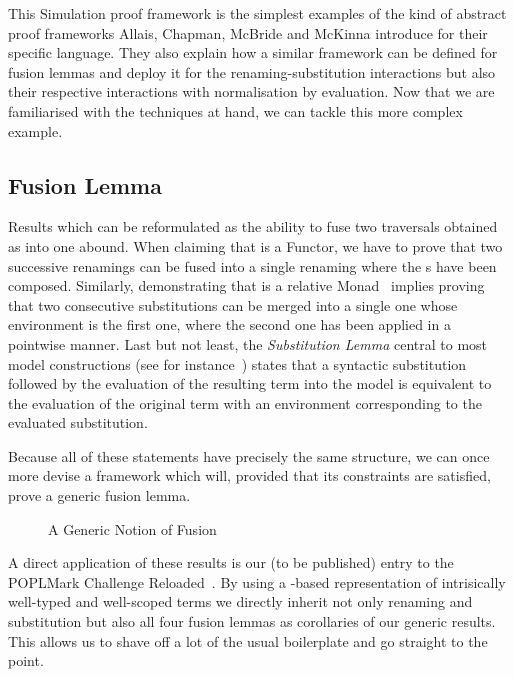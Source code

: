 This Simulation proof framework is the simplest examples of the kind of abstract
proof frameworks Allais, Chapman, McBride and McKinna introduce for their
specific language. They also explain how a similar framework can be defined
for fusion lemmas and deploy it for the renaming-substitution interactions
but also their respective interactions with normalisation by evaluation.
Now that we are familiarised with the techniques at hand, we can tackle
this more complex example.



\subsection{Fusion Lemma}

Results which can be reformulated as the ability to fuse two traversals
obtained as  into one abound. When claiming that  is
a Functor, we have to prove that two successive renamings can be fused into
a single renaming where the s have been composed. Similarly,
demonstrating that  is a relative Monad~\cite{JFR4389} implies proving
that two consecutive substitutions can be merged into a single one whose
environment is the first one, where the second one has been applied in a
pointwise manner. Last but not least, the \emph{Substitution Lemma} central
to most model constructions (see for instance~\cite{mitchell1991kripke}) states
that a syntactic substitution followed by the evaluation of the resulting term
into the model is equivalent to the evaluation of the original term with an
environment corresponding to the evaluated substitution.

Because all of these statements have precisely the same structure, we can
once more devise a framework which will, provided that its constraints are
satisfied, prove a generic fusion lemma.

\begin{figure}[h]
\caption{A Generic Notion of Fusion}
\end{figure}

A direct application of these results is our (to be published) entry to the
POPLMark Challenge Reloaded~\citeyear{poplmarkreloaded}. By using a -based
representation of intrisically well-typed and well-scoped terms we directly inherit
not only renaming and substitution but also all four fusion lemmas as corollaries
of our generic results. This allows us to shave off a lot of the usual boilerplate
and go straight to the point.

